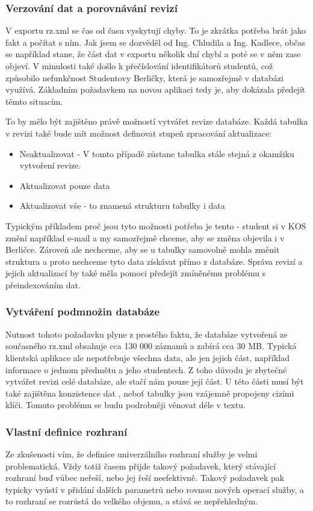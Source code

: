 \documentclass[11pt,twoside,a4paper]{book}
\begin{document}
\subsubsection{Verzování dat a porovnávání revizí}
V exportu rz.xml se čas od času vyskytují chyby. To je zkrátka potřeba brát jako fakt a počítat s ním. Jak jsem se dozvěděl od Ing. Chludila a Ing. Kadlece, občas se například stane, že část dat v exportu několik dní chybí a poté se v něm zase objeví. V minulosti také došlo k přečíslování identifikátorů studentů, což způsobilo nefunkčnost Studentovy Berličky, která je samozřejmě v databázi využívá. Základním požadavkem na novou aplikaci tedy je, aby dokázala předejít těmto situacím.

To by mělo být zajištěno právě možností vytvářet revize databáze. Každá tabulka v revizi také bude mít možnost definovat stupeň zpracování aktualizace:
\begin{itemize}
\item Neaktualizovat - V tomto případě zůstane tabulka stále stejná z okamžiku vytvoření revize.
\item Aktualizovat pouze data
\item Aktualizovat vše - to znamená strukturu tabulky i data
\end{itemize}

Typickým příkladem proč jsou tyto možnosti potřeba je tento - student si v KOS změní například e-mail a my samozřejmě chceme, aby se změna objevila i v Berličce. Zároveň ale nechceme, aby se u tabulky samovolně mohla změnit struktura a proto nechceme tyto data získávat přímo z  databáze. Správa revizí a jejich aktualizací by také měla pomoci předejít zmíněnému problému s přeindexováním dat.

\subsubsection{Vytváření podmnožin databáze}
Nutnost tohoto požadavku plyne z prostého faktu, že databáze vytvořená ze současného rz.xml obsahuje cca 130 000 záznamů a zabírá cca 30 MB. Typická klientská aplikace ale nepotřebuje všechna data, ale jen jejich část, například informace o jednom předmětu a jeho studentech. Z toho důvodu je zbytečné vytvářet revizi celé databáze, ale stačí nám pouze její část. U této části musí být také zajištěna konzistence dat , neboť tabulky jsou vzájemně propojeny cizími klíči. Tomuto problému se budu podrobněji věnovat déle v textu.

\subsubsection{Vlastní definice rozhraní}
Ze zkušenosti vím, že definice univerzálního rozhraní služby je velmi problematická. Vždy totiž časem přijde takový požadavek, který stávající rozhraní buď vůbec neřeší, nebo jej řeší neefektivně. Takový požadavek pak typicky vyústí v přidání dalších parametrů nebo rovnou nových operací služby, a to  rozhraní se rozrůstá do velkého objemu, a stává se nepřehledným.
\end{document}
